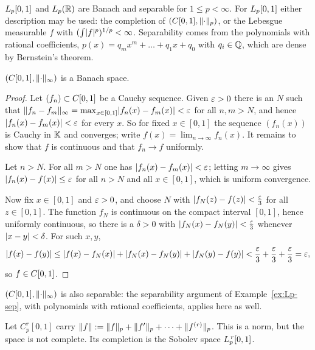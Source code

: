 \begin{example}\label{ex:Lp-sep}
$L_{p}[0,1]$ and $L_{p}(\mathbb{R})$ are Banach and separable for
$1 \le p < \infty$. For $L_{p}[0,1]$ either description may be used: the
completion of $(C[0,1], \lVert\cdot\rVert_p)$, or the Lebesgue measurable $f$
with $(\int \lvert f\rvert^p)^{1/p} < \infty$. Separability comes from the
polynomials with rational coefficients,
$p(x) = q_m x^m + \dots + q_1 x + q_0$ with $q_i \in \mathbb{Q}$, which are dense by
Bernstein's theorem.
\end{example}

\begin{theorem}\label{thm:C-sup-banach}
$(C[0,1], \lVert\cdot\rVert_\infty)$ is a Banach space.
\end{theorem}

\begin{proof}
Let $(f_n) \subset C[0,1]$ be a Cauchy sequence. Given $\varepsilon > 0$
there is an $N$ such that
$\lVert f_n - f_m\rVert_\infty = \max_{x \in [0,1]} \lvert f_n(x) - f_m(x)\rvert < \varepsilon$
for all $n, m > N$, and hence $\lvert f_n(x) - f_m(x)\rvert < \varepsilon$ for every $x$. So for fixed $x \in [0,1]$ the
sequence $(f_n(x))$ is Cauchy in $\mathbb{K}$ and converges; write
$f(x) = \lim_{n \to \infty} f_n(x)$. It remains to show that $f$ is
continuous and that $f_n \to f$ uniformly.

Let $n > N$. For all $m > N$ one has $\lvert f_n(x) - f_m(x)\rvert < \varepsilon$; letting
$m \to \infty$ gives $\lvert f_n(x) - f(x)\rvert \le \varepsilon$ for all $n > N$ and all
$x \in [0,1]$, which is uniform convergence.

Now fix $x \in [0,1]$ and $\varepsilon > 0$, and choose $N$ with
$\lvert f_N(z) - f(z)\rvert < \frac{\varepsilon}{3}$ for all $z \in [0,1]$. The function
$f_N$ is continuous on the compact interval $[0,1]$, hence uniformly
continuous, so there is a $\delta > 0$ with
$\lvert f_N(x) - f_N(y)\rvert < \frac{\varepsilon}{3}$ whenever $\lvert x-y\rvert < \delta$. For
such $x, y$,
\[
  \lvert f(x) - f(y)\rvert
  \le \lvert f(x) - f_N(x)\rvert + \lvert f_N(x) - f_N(y)\rvert + \lvert f_N(y) - f(y)\rvert
  < \frac{\varepsilon}{3} + \frac{\varepsilon}{3} + \frac{\varepsilon}{3} = \varepsilon ,
\]
so $f \in C[0,1]$.
\end{proof}

\begin{example}\label{ex:C-sup-sep}
$(C[0,1], \lVert\cdot\rVert_\infty)$ is also separable: the separability
argument of Example~\ref{ex:Lp-sep}, with polynomials with rational
coefficients, applies here as well.
\end{example}

\begin{example}\label{ex:Crp}
Let $C^r_p[0,1]$ carry
$\lVert f\rVert := \lVert f\rVert_p + \lVert f'\rVert_p + \dots + \lVert f^{(r)}\rVert_p$. This is a
norm, but the space is not complete. Its completion is the Sobolev space
$L_{p}^{\,r}[0,1]$.
\end{example}


